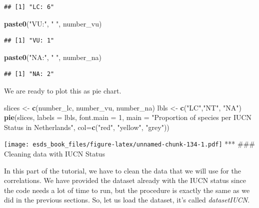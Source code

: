 \documentclass[
]{book}
\newenvironment{Shaded}{\begin{snugshade}}{\end{snugshade}}
\newcommand{\DataTypeTok}[1]{\textcolor[rgb]{0.13,0.29,0.53}{#1}}
\newcommand{\DecValTok}[1]{\textcolor[rgb]{0.00,0.00,0.81}{#1}}
\newcommand{\KeywordTok}[1]{\textcolor[rgb]{0.13,0.29,0.53}{\textbf{#1}}}
\newcommand{\NormalTok}[1]{#1}
\newcommand{\StringTok}[1]{\textcolor[rgb]{0.31,0.60,0.02}{#1}}
\begin{document}
\begin{verbatim}
## [1] "LC: 6"
\end{verbatim}

\begin{Shaded}
\begin{Highlighting}[]
\KeywordTok{paste0}\NormalTok{(}\StringTok{"VU:"}\NormalTok{, }\StringTok{" "}\NormalTok{, number_vu)}
\end{Highlighting}
\end{Shaded}

\begin{verbatim}
## [1] "VU: 1"
\end{verbatim}

\begin{Shaded}
\begin{Highlighting}[]
\KeywordTok{paste0}\NormalTok{(}\StringTok{"NA:"}\NormalTok{, }\StringTok{" "}\NormalTok{, number_na)}
\end{Highlighting}
\end{Shaded}

\begin{verbatim}
## [1] "NA: 2"
\end{verbatim}

We are ready to plot this as pie chart.

\begin{Shaded}
\begin{Highlighting}[]
\NormalTok{slices <-}\StringTok{ }\KeywordTok{c}\NormalTok{(number_lc, number_vu, number_na)}
\NormalTok{lbls <-}\StringTok{ }\KeywordTok{c}\NormalTok{(}\StringTok{"LC"}\NormalTok{,}\StringTok{"NT"}\NormalTok{, }\StringTok{"NA"}\NormalTok{)}
\KeywordTok{pie}\NormalTok{(slices, }\DataTypeTok{labels =}\NormalTok{ lbls, }\DataTypeTok{font.main =} \DecValTok{1}\NormalTok{, }
\DataTypeTok{main =} \StringTok{"Proportion of species per IUCN Status in Netherlands"}\NormalTok{, }\DataTypeTok{col=}\KeywordTok{c}\NormalTok{(}\StringTok{"red"}\NormalTok{, }\StringTok{"yellow"}\NormalTok{, }\StringTok{"grey"}\NormalTok{)) }
\end{Highlighting}
\end{Shaded}

\texttt{[image: esds\_book\_files/figure-latex/unnamed-chunk-134-1.pdf]}
***
\#\#\# Cleaning data with IUCN Status

In this part of the tutorial, we have to clean the data that we will use for the correlations. We have provided the dataset already with the IUCN status since the code needs a lot of time to run, but the procedure is exactly the same as we did in the previous sections. So, let us load the dataset, it's called \emph{datasetIUCN}.
\end{document}
